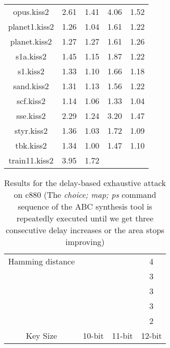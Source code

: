 \begin{table*}
\begin{tabular}{ | c | c | c | c | c | }
opus.kiss2&2.61&1.41&4.06&1.52\\
planet1.kiss2&1.26&1.04&1.61&1.22\\
planet.kiss2&1.27&1.27&1.61&1.26\\
s1a.kiss2&1.45&1.15&1.87&1.22\\
s1.kiss2&1.33&1.10&1.66&1.18\\
sand.kiss2&1.31&1.13&1.56&1.22\\
scf.kiss2&1.14&1.06&1.33&1.04\\
sse.kiss2&2.29&1.24&3.20&1.47\\
styr.kiss2&1.36&1.03&1.72&1.09\\
tbk.kiss2&1.34&1.00&1.47&1.10\\
train11.kiss2&3.95&1.72&&\\
\hline
\end{tabular}
\end{table*}

\begin{table}
\caption{Results for the delay-based exhaustive attack on c880 (The \emph{choice; map; ps} command sequence of the ABC synthesis tool is repeatedly executed until we get three consecutive delay increases or the area stops improving)}
\begin{tabular}{ | c | c | c | c | }
\hline
Hamming distance & &  & 4 \\
&&  & 3 \\
&&  & 3 \\
&&  & 3 \\
&&  & 2 \\
\hline
Key Size & 10-bit & 11-bit & 12-bit \\
\hline
\end{tabular}
\end{table}

